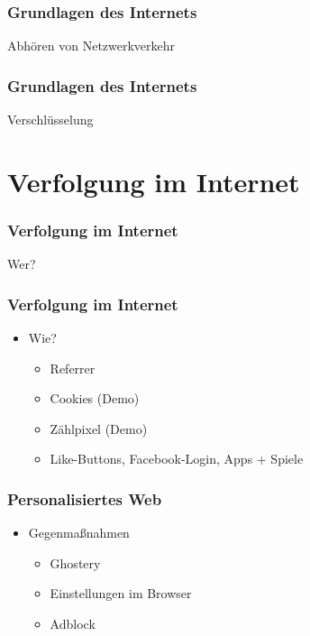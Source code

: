 \documentclass[12pt]{beamer}
\begin{document}
\begin{frame}
  \frametitle{Grundlagen des Internets}
  \begin{center} \Large
  Abhören von Netzwerkverkehr
  \end{center}
\end{frame}

\begin{frame}
  \frametitle{Grundlagen des Internets}
  \begin{center} \Large
  Verschlüsselung
  \end{center}
\end{frame}

\section{Verfolgung im Internet}

\begin{frame}
  \frametitle{Verfolgung im Internet}
  \begin{center} \Large
  Wer?
  \end{center}
\end{frame}

\begin{frame}
  \frametitle{Verfolgung im Internet}
  \begin{itemize}
    \item<1-> Wie?
      \begin{itemize}
        \item<2-> Referrer
        \item<3-> Cookies (Demo)
        \item<4-> Zählpixel (Demo)
        \item<5-> Like-Buttons, Facebook-Login, Apps + Spiele
      \end{itemize}
  \end{itemize}
\end{frame}

\begin{frame}
  \frametitle{Personalisiertes Web}
  \begin{itemize}
    \item<1-> Gegenmaßnahmen 
      \begin{itemize}
        \item<2-> Ghostery
        \item<3-> Einstellungen im Browser
        \item<4-> Adblock
      \end{itemize}
  \end{itemize}
\end{frame}
\end{document}
